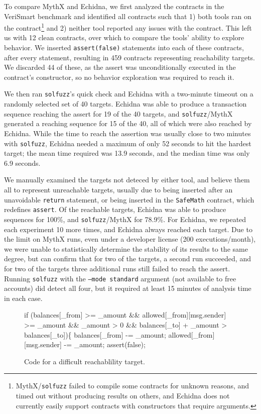 To compare MythX and Echidna, we first analyzed the contracts in the VeriSmart benchmark \cite{vsbenchmark} and identified all contracts such that 1) both tools ran on the contract\footnote{MythX/{\tt solfuzz} failed to compile some contracts for unknown reasons, and timed out without producing results on others, and Echidna does not currently easily support contracts with constructors that require arguments.} and 2) neither tool reported any issues with the contract.  This left us with 12 clean contracts, over which to compare the tools' ability to explore behavior.  We inserted {\tt assert(false)} statements into each of these contracts, after every statement, resulting in 459 contracts representing reachability targets.  We discarded 44 of these, as the assert was unconditionally executed in the contract's constructor, so no behavior exploration was required to reach it.

We then ran {\tt solfuzz}'s quick check and Echidna with a two-minute timeout on a randomly selected set of 40 targets.  Echidna was able to produce a transaction sequence reaching the assert for 19 of the 40 targets, and {\tt solfuzz}/MythX generated a reaching sequence for 15 of the 40, all of which were also reached by Echidna.  While the time to reach the assertion was usually close to two minutes with {\tt solfuzz}, Echidna needed a maximum of only 52 seconds to hit the hardest target; the mean time required was 13.9 seconds, and the median time was only 6.9 seconds.

We manually examined the targets not deteced by either tool, and believe them all to represent unreachable targets, usually due to being inserted after an unavoidable {\tt return} statement, or being inserted in the {\tt SafeMath} contract, which redefines {\tt assert}.  Of the reachable targets, Echidna was able to produce sequences for 100\%, and {\tt solfuzz}/MythX for 78.9\%.  For Echidna, we repeated each experiment 10 more times, and Echidna always reached each target.  Due to the limit on MythX runs, even under a developer license (200 executions/month), we were unable to statistically determine the stability of its results to the same degree, but can confirm that  for two of the targets, a second run succeeded, and for two of the targets three additional runs still failed to reach the assert.  Running {\tt solfuzz} with the {\tt --mode standard} argument (not available to free accounts) did detect all four, but it required at least 15 minutes of analysis time in each case.

\begin{figure}
  \begin{code}
if (balances[\_from] >= \_amount
  \&\& allowed[\_from][msg.sender] >= \_amount
  \&\& \_amount > 0
  \&\& balances[\_to] + \_amount > balances[\_to])\{
    balances[\_from] -= \_amount;
    allowed[\_from][msg.sender] -= \_amount;
\vspace{0.1in}
    assert(false);
  \end{code}
  \caption{Code for a difficult reachablility target.}
  \label{fig:code}
  \end{figure}

